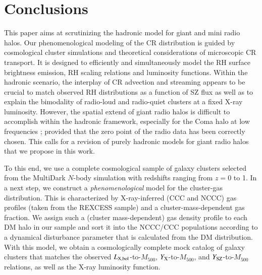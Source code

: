 \documentclass[useAMS,usenatbib]{mn2e}
\begin{document}


\section{Conclusions}
\label{sec:6}
This paper aims at scrutinizing the hadronic model for giant and mini radio
halos. Our phenomenological modeling of the CR distribution is guided by
cosmological cluster simulations and theoretical considerations of microscopic
CR transport. It is designed to efficiently and simultaneously model the RH
surface brightness emission, RH scaling relations and luminosity
functions. Within the hadronic scenario, the interplay of CR advection and
streaming appears to be crucial to match observed RH distributions as a function
of SZ flux as well as to explain the bimodality of radio-loud and radio-quiet
clusters at a fixed X-ray luminosity. However, the spatial extend of giant radio
halos is difficult to accomplish within the hadronic framework, especially for
the Coma halo at low frequencies \citep{2012arXiv1207.3025B}; provided that the
zero point of the radio data has been correctly chosen. This calls for a
revision of purely hadronic models for giant radio halos that we propose in this
work.

To this end, we use a complete cosmological sample of galaxy clusters selected
from the MultiDark $N$-body simulation with redshifts ranging from $z = 0$ to
1. In a next step, we construct a \emph{phenomenological} model for the
cluster-gas distribution. This is characterized by X-ray-inferred (CCC and NCCC)
gas profiles (taken from the REXCESS sample) and a cluster-mass-dependent gas
fraction. We assign such a (cluster mass-dependent) gas density profile to each
DM halo in our sample and sort it into the NCCC/CCC populations according to a
dynamical disturbance parameter that is calculated from the DM distribution.
With this model, we obtain a cosmologically complete mock catalog of galaxy
clusters that matches the observed $L_{{\mathrm{X, bol}}}$-to-$M_{500}$,
$Y_{{\mathrm{X}}}$-to-$M_{500}$, and $Y_{{\mathrm{SZ}}}$-to-$M_{500}$ relations, as well
as the X-ray luminosity function.
\end{document}
